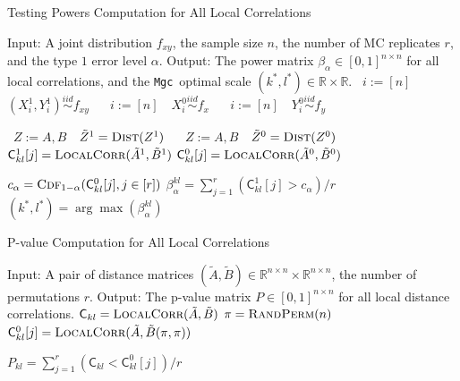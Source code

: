 \documentclass[11pt]{article}
\providecommand{\sct}[1]{{\sc \texttt{#1}}}
\newcommand{\Real}{\mathbb{R}}
\newcommand{\G}{\mathsf{C}}
\newcommand{\Linefor}[2]{%
    \State \algorithmicfor\ {#1}\ \algorithmicdo\ {#2} \algorithmicend\ \algorithmicfor%
}
\newcommand{\Mgc}{\sct{Mgc}}
\begin{document}
\begin{algorithm}
\caption{Testing Powers Computation for All Local Correlations}
\label{alg3}
\begin{algorithmic}[1]
\Statex Input: A joint distribution $f_{xy}$, the sample size $n$, the number of MC replicates $r$, and the type $1$ error level $\alpha$.
\Statex Output: The power matrix $\beta_{\alpha} \in [0,1]^{n \times n}$ for all local correlations, and the \Mgc~optimal scale $(k^{*},l^{*}) \in \Real \times \Real$.
\Linefor{$i:=[n]$}{$(X^{1}_{i},Y^{1}_{i}) \stackrel{iid}{\sim} f_{xy}$} 
\Linefor{$i:=[n]$}{$X^{0}_{i} \stackrel{iid}{\sim} f_{x}$} 
\Linefor{$i:=[n]$}{$Y^{0}_{i} \stackrel{iid}{\sim} f_{y}$} 
\Linefor{$Z:=A,B$}{$\tilde{Z}^{1}=\textsc{Dist}(Z^{1})$} 
\Linefor{$Z:=A,B$}{$\tilde{Z}^{0}=\textsc{Dist}(Z^{0})$} 
\State $\G_{kl}^{1}[j]=\textsc{LocalCorr}(\tilde{A}^{1},\tilde{B}^{1})$  
\State $\G_{kl}^{0}[j]=\textsc{LocalCorr}(\tilde{A}^{0},\tilde{B}^{0})$  
\EndFor

\State $c_{\alpha}=\textsc{Cdf}_{1-\alpha}(\G^{0}_{kl}[j],j \in [r])$ 
\State $\beta_{\alpha}^{kl}=\sum_{j=1}^{r}(\G^{1}_{kl}[j]>c_{\alpha}) / r$ 
\EndFor
\State $(k^{*},l^{*})=\arg\max(\beta_{\alpha}^{kl})$ 
\EndFunction
\end{algorithmic}
\end{algorithm}

\begin{algorithm}
\caption{P-value Computation for All Local Correlations}
\label{alg4}
\begin{algorithmic}[1]
\Statex Input: A pair of distance matrices $(\tilde{A},\tilde{B}) \in \Real^{n \times n} \times \Real^{n \times n}$, the number of permutations $r$.
\Statex Output: The p-value matrix $P \in [0,1]^{n \times n}$ for all local distance correlations.
\State $\G_{kl}=\textsc{LocalCorr}(\tilde{A},\tilde{B})$ 
\State $\pi=\textsc{RandPerm}(n)$ 
\State $\G_{kl}^{0}[j]=\textsc{LocalCorr}(\tilde{A},\tilde{B}(\pi,\pi))$ 
\EndFor

\State $P_{kl}=\sum_{j=1}^{r}(\G_{kl}<\G^{0}_{kl}[j])/r$ 
\EndFor
\EndFunction
\end{algorithmic}
\end{algorithm}
\end{document}
